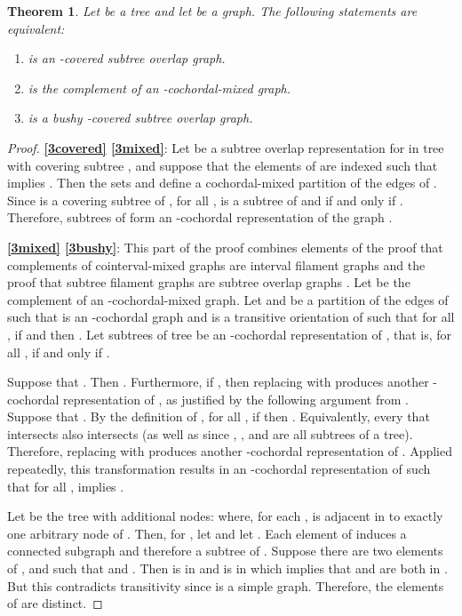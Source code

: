 \documentclass[
final
]{dmtcs-episciences}        \usepackage{graphics, amsthm, amsmath, amssymb, algorithm, algorithmic}
\newtheorem{theorem}{Theorem}
\begin{document}
\begin{theorem} \label{th:3parts}
Let  be a tree and let  be a graph. The following statements are equivalent:
\begin{enumerate}
\item  is an -covered subtree overlap graph. \label{3covered}
\item  is the complement of an -cochordal-mixed graph. \label{3mixed}
\item  is a bushy -covered subtree overlap graph. \label{3bushy}
\end{enumerate}
\end{theorem}
\begin{proof}

\textbf{\ref{3covered}  \ref{3mixed}}: 
Let  be a subtree overlap representation for  in tree  with covering subtree , and suppose that the elements of  are indexed such that  implies .
Then the sets  and 
 define a cochordal-mixed partition of the edges of .
 Since  is a covering subtree of , for all ,  is a subtree of  and  if and only if .
Therefore, subtrees  of  form an -cochordal representation of the graph .
 
\textbf{\ref{3mixed}  \ref{3bushy}}: 
This part of the proof combines elements of the proof that complements of cointerval-mixed graphs are interval filament graphs \cite{gavril2000} and the proof that subtree filament graphs are subtree overlap graphs \cite{Jess}. 
Let  be the complement of an -cochordal-mixed graph.
Let  and  be a partition of the edges of  
such that  is an -cochordal graph
and  is a transitive orientation of  such that
for all , if
 and  then . 
Let subtrees  of tree  be an -cochordal representation of , that is, for all ,  if and only if .
      
Suppose that 
. Then . 
Furthermore, if , then
replacing  with  produces another -cochordal representation of , as justified by the following argument from \cite{gavril2000}.
Suppose that .
By the definition of , for all , if  then . Equivalently, every  that intersects  also intersects  (as well as  since , , and  are all subtrees of a tree).
Therefore, replacing  with  produces another -cochordal representation of .
Applied repeatedly, this transformation results in an -cochordal representation of  such that for all ,  implies . 
      
Let  be the tree  with  additional nodes:  where, for each ,  is adjacent in  to exactly one arbitrary node of .
Then, for , let  and let . 
Each element of  induces a connected subgraph and therefore a subtree of .
Suppose there are two elements of ,  and  such that  and . Then  is in  and  is in  which implies that  and   are both in . But this contradicts transitivity since 
 is a simple graph. Therefore,
the elements of  are distinct.


\end{proof}
\end{document}
